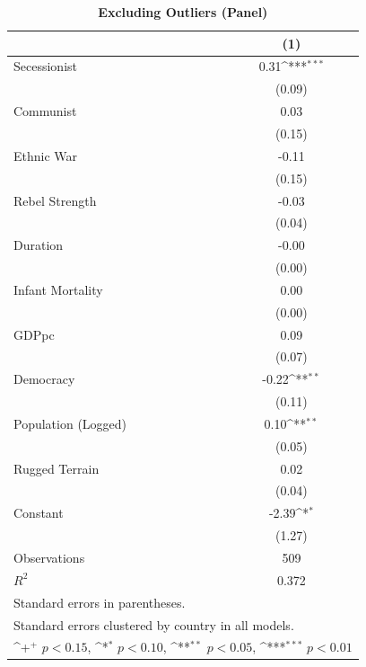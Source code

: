 \documentclass[12pt, letterpaper]{article}
\begin{document}
\newpage
\begin{table}[htbp]\centering
\begin{small}
\def\sym#1{\ifmmode^{#1}\else\(^{#1}\)\fi}
\renewcommand\thetable{A.\Roman{table}}
\makeatletter
\def\myrow{}
\CT@everycr{\noalign{%
\global\let\CT@row@color\relax
\stepcounter{mym17}%
\ifnum\value{mym17}=2
  \gdef\myrow{\rowcolor{gray!50}}
\else\ifnum\value{mym17}=4
  \gdef\myrow{}
\fi\fi
}\myrow}
\caption{\textbf{Excluding Outliers (Panel)}}
\begin{tabular}{l*{1}{c}}
\hline\hline
                    &\multicolumn{1}{c}{(1)}\\
\hline
Secessionist      &        0.31\sym{***}\\
                    &      (0.09)         \\
Communist           &        0.03         \\
                    &      (0.15)         \\
Ethnic War          &       -0.11         \\
                    &      (0.15)         \\
Rebel Strength      &       -0.03         \\
                    &      (0.04)         \\
Duration            &       -0.00         \\
                    &      (0.00)         \\
Infant Mortality    &        0.00         \\
                    &      (0.00)         \\
GDPpc               &        0.09         \\
                    &      (0.07)         \\
Democracy           &       -0.22\sym{**} \\
                    &      (0.11)         \\
Population (Logged) &        0.10\sym{**} \\
                    &      (0.05)         \\
Rugged Terrain      &        0.02         \\
                    &      (0.04)         \\
Constant            &       -2.39\sym{*}  \\
                    &      (1.27)         \\
\hline
Observations        &         509         \\
\(R^{2}\)           &       0.372         \\
\hline\hline
\multicolumn{2}{l}{\footnotesize Standard errors in parentheses.}\\
\multicolumn{2}{l}{\footnotesize Standard errors clustered by country in all models.}\\
\multicolumn{2}{l}{\footnotesize \sym{+} \(p<0.15\), \sym{*} \(p<0.10\), \sym{**} \(p<0.05\), \sym{***} \(p<0.01\)}\\
\end{tabular}
\end{small}
\end{table}
\end{document}
